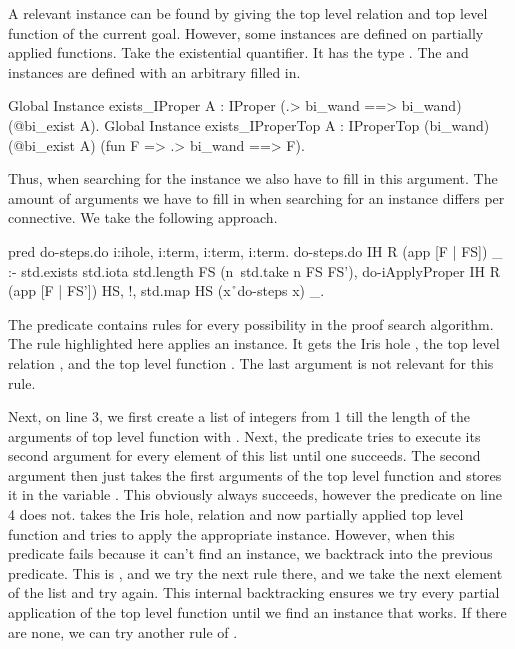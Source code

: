 \documentclass[thesis.tex]{subfiles}
\begin{document}
A relevant  instance can be found by giving the top level relation and top level function of the current goal. However, some  instances are defined on partially applied functions. Take the existential quantifier. It has the type . The  and  instances are defined with an arbitrary  filled in.
\begin{coqcode}
  Global Instance exists_IProper {A} : 
    IProper (.> bi_wand ==> bi_wand) 
            (@bi_exist A).
  Global Instance exists_IProperTop {A} : 
    IProperTop (bi_wand) (@bi_exist A) 
               (fun F => .> bi_wand ==> F).
\end{coqcode}
Thus, when searching for the instance we also have to fill in this argument. The amount of arguments we have to fill in when searching for an  instance differs per connective. We take the following approach.
\begin{elpicode}
  pred do-steps.do i:ihole, i:term, i:term, i:term.
  do-steps.do IH R (app [F | FS]) _ :- 
    std.exists { std.iota {std.length FS} } 
               (n\ std.take n FS FS'),
    do-iApplyProper IH R (app [F | FS']) HS, !,
    std.map HS (x\r\ do-steps x) _.
\end{elpicode}
The  predicate contains rules for every possibility in the proof search algorithm. The rule highlighted here applies an  instance. It gets the Iris hole , the top level relation , and the top level function . The last argument is not relevant for this rule.

Next, on line 3, we first create a list of integers from 1 till the length of the arguments of top level function with . Next, the  predicate tries to execute its second argument for every element of this list until one succeeds. The second argument then just takes the first  arguments of the top level function and stores it in the variable . This obviously always succeeds, however the predicate on line 4 does not.  takes the Iris hole, relation and now partially applied top level function and tries to apply the appropriate  instance. However, when this predicate fails because it can't find an  instance, we backtrack into the previous predicate. This is , and we try the next rule there, and we take the next element of the list and try again. This internal backtracking ensures we try every partial application of the top level function until we find an  instance that works. If there are none, we can try another rule of .
\end{document}
